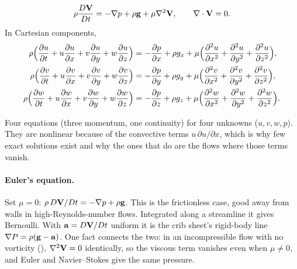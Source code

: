 \begin{theorem}
\[
\rho\frac{D\mathbf{V}}{Dt} = -\nabla p + \rho\mathbf{g} + \mu\nabla^2\mathbf{V},
\qquad \nabla\cdot\mathbf{V} = 0 .
\]
In Cartesian components,
\begin{align*}
\rho\Big(\frac{\partial u}{\partial t} + u\frac{\partial u}{\partial x} + v\frac{\partial u}{\partial y} + w\frac{\partial u}{\partial z}\Big) &= -\frac{\partial p}{\partial x} + \rho g_x + \mu\Big(\frac{\partial^2 u}{\partial x^2} + \frac{\partial^2 u}{\partial y^2} + \frac{\partial^2 u}{\partial z^2}\Big), \\
\rho\Big(\frac{\partial v}{\partial t} + u\frac{\partial v}{\partial x} + v\frac{\partial v}{\partial y} + w\frac{\partial v}{\partial z}\Big) &= -\frac{\partial p}{\partial y} + \rho g_y + \mu\Big(\frac{\partial^2 v}{\partial x^2} + \frac{\partial^2 v}{\partial y^2} + \frac{\partial^2 v}{\partial z^2}\Big), \\
\rho\Big(\frac{\partial w}{\partial t} + u\frac{\partial w}{\partial x} + v\frac{\partial w}{\partial y} + w\frac{\partial w}{\partial z}\Big) &= -\frac{\partial p}{\partial z} + \rho g_z + \mu\Big(\frac{\partial^2 w}{\partial x^2} + \frac{\partial^2 w}{\partial y^2} + \frac{\partial^2 w}{\partial z^2}\Big).
\end{align*}
\end{theorem}

Four equations (three momentum, one continuity) for four unknowns ($u, v, w, p$). They are nonlinear because of the convective terms $u\,\partial u/\partial x$, which is why few exact solutions exist and why the ones that do are the flows where those terms vanish.

\paragraph{Euler's equation.} Set $\mu = 0$: $\rho\,D\mathbf{V}/Dt = -\nabla p + \rho\mathbf{g}$. This is the frictionless case, good away from walls in high-Reynolds-number flows. Integrated along a streamline it gives Bernoulli. With $\mathbf{a} = D\mathbf{V}/Dt$ uniform it is the crib sheet's rigid-body line $\nabla P = \rho(\mathbf{g} - \mathbf{a})$. One fact connects the two: in an incompressible flow with no vorticity (), $\nabla^2\mathbf{V} = 0$ identically, so the viscous term vanishes even when $\mu \ne 0$, and Euler and Navier--Stokes give the same pressure.


